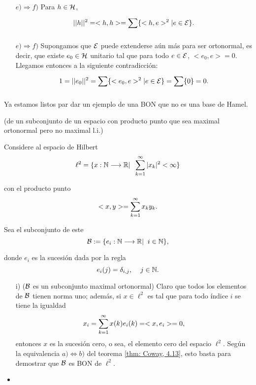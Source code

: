 \begin{itemize}
\item[$e) \Rightarrow f)$] Para $h \in \mathcal{H}$,
\[
||h||^{2}=<h,h> = \sum\limits_{}^{}\{ <h,e>^{2}| e \in \mathcal{E} \}.
\]

\item[$e) \Rightarrow f)$]
Supongamos que $\mathcal{E}$ puede extenderse aún más
para ser ortonormal, es decir, que existe 
$e_{0} \in \mathcal{H}$ unitario tal que
para todo $e \in \mathcal{E}$, $<e_{0}, e>=0$. 
Llegamos entonces a la siguiente contradicción:
\[
1=||e_{0}||^{2}=\sum\limits_{}^{}\{ <e_{0}, e>^{2}| e \in \mathcal{E} \}=
\sum\limits_{}^{}\{ 0\}=0.
\]
\QEDB
\end{itemize}
\vspace{0.2cm}

Ya estamos listos par dar un ejemplo de una BON que
no es una base de Hamel.


\begin{ej}
(de un subconjunto de un espacio
con producto punto que sea maximal ortonormal pero no maximal l.i.)

Considere al espacio de Hilbert
\[
\ell^{2}= \{ x: \mathbb{N} \longrightarrow \mathbb{R} | \hspace{0.2cm} 
\sum\limits_{k=1}^{\infty}|x_{k}|^{2}< \infty \}
\]

con el producto punto
\[
<x,y>= \sum\limits_{k=1}^{\infty}x_{k}y_{k}.
\]

Sea el subconjunto de este
\[
\mathcal{B}:= \{e_{i}: \mathbb{N} \longrightarrow \mathbb{R}| \hspace{0.2cm} i \in \mathbb{N} \},
\]

donde $e_{i}$ es la sucesión dada por la regla
\[
e_{i}(j)=\delta_{i,j}, \hspace{0.4cm} j \in \mathbb{N}.
\]


\begin{itemize}
\item[i)]($\mathcal{B}$ es un subconjunto maximal ortonormal) 
Claro que todos los elementos de $\mathcal{B}$ tienen norma uno;
además, si $x \in \ell^{2}$ es tal que para todo índice $i$
se tiene la igualdad
\[
x_{i}= \sum\limits_{k=1}^{\infty}x(k)e_{i}(k)=<x,e_{i}>=0,
\]
entonces $x$ es la sucesión cero, o sea,
el elemento cero del espacio
$\ell^{2}$. Según la equivalencia
$a) \iff b)$ del teorema \ref{thm: Coway, 4.13}, esto basta
para demostrar que $\mathcal{B}$ es BON de $\ell^{2}$.

\item

\end{itemize}
\end{ej}


